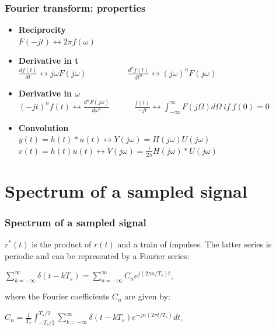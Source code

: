 \begin{frame}
	\frametitle{Fourier transform: properties}
	\begin{itemize}
		\item \textbf{Reciprocity} \\
		\medskip
		$F(-jt) \leftrightarrow  2 \pi f(\omega)$
		\medskip
		\item \textbf{Derivative in t} \\
		\medskip
		$\frac{df(t)}{dt} \leftrightarrow j\omega F(j\omega) \qquad \qquad \quad \frac{d^nf(t)}{dt^n} \leftrightarrow (j\omega)^n F(j\omega)$
		\medskip
		\item \textbf{Derivative in $\omega$} \\
		\medskip
		$(-jt)^n f(t) \leftrightarrow \frac{d^n F(j\omega)}{d\omega^n} \qquad \quad \frac{f(t)}{-jt} \leftrightarrow \int_{-\infty}^\infty F(j\Omega) d\Omega \> if \> f(0) = 0$
		\medskip
		\item \textbf{Convolution} \\
		\medskip
		$y(t) = h(t) * u(t) \leftrightarrow Y(j\omega) = H(j\omega) U(j\omega)$\\
		$v(t) = h(t)u(t) \leftrightarrow V(j\omega) = \frac{1}{2\pi} H(j\omega)*U(j\omega)$
	\end{itemize}
\end{frame}

\section{Spectrum of a sampled signal}

\begin{frame}
	\frametitle{Spectrum of a sampled signal}
	$r^*(t)$ is the product of $r(t)$ and a train of impulses. The latter series is periodic and can be represented by a Fourier series:\\
	\begin{center}
		$\sum_{k=-\infty}^{\infty} \delta(t-kT_s) = \sum_{n=-\infty}^{\infty} C_ne^{j(2\pi n/T_s)t}$,
	\end{center}
	where the Fourier coefficients $C_n$ are given by:\\
	\begin{center}
		$C_n=\frac{1}{T_s}\int_{-T_s/2}^{T_s/2} \sum_{k=-\infty}^{\infty} \delta(t-kT_s)e^{-jn(2\pi t/T_s)}dt$.
	\end{center}
	
\end{frame}


